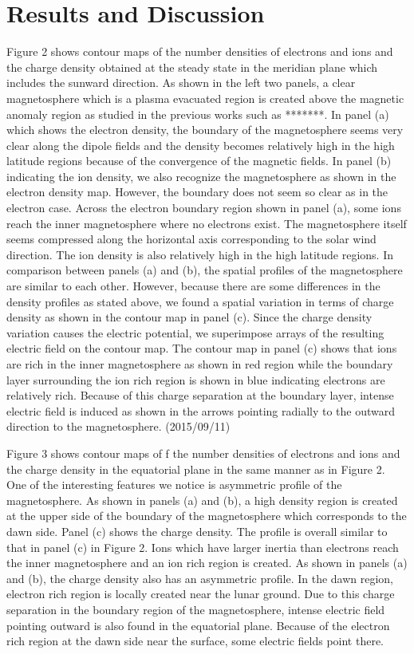 \documentclass{EPS}
\begin{document}
\section{Results and Discussion}


Figure 2 shows contour maps of the number densities of electrons and ions and the charge 
density obtained at the steady state in the meridian plane which includes the sunward direction. 
As shown in the left two panels, a clear magnetosphere which is a plasma evacuated region is 
created above the magnetic anomaly region as studied in the previous works such as *******. 
In panel (a) which shows the electron density, the boundary of the magnetosphere seems 
very clear along the dipole fields and the density becomes relatively high in the high latitude regions 
because of the convergence of the magnetic fields.  
In panel (b) indicating the ion density, we also recognize the magnetosphere as shown in the electron density map. 
However, the boundary does not seem so clear as in the electron case. 
Across the electron boundary region shown in panel (a), some ions reach the inner magnetosphere 
where no electrons exist. 
The magnetosphere itself seems compressed along the horizontal axis corresponding to the solar wind direction. 
The ion density is also relatively high in the high latitude regions. 
In comparison between panels (a) and (b), the spatial profiles of the magnetosphere are similar to each other. 
However, because there are some differences in the density profiles as stated above, 
we found a spatial variation in terms of charge density as shown in the contour map in panel (c). 
Since the charge density variation causes the electric potential, 
we superimpose arrays of the resulting electric field on the contour map. 
The contour map in panel (c) shows that ions are rich in the inner magnetosphere as shown in red region 
while the boundary layer surrounding the ion rich region is shown in blue indicating electrons are relatively rich. 
Because of this charge separation at the boundary layer, intense electric field is induced 
as shown in the arrows pointing radially to the outward direction to the magnetosphere.  (2015/09/11)

Figure 3 shows contour maps of f the number densities of electrons and ions and the charge density 
in the equatorial plane in the same manner as in Figure 2. 
One of the interesting features we notice is asymmetric profile of the magnetosphere. 
As shown in panels (a) and (b), a high density region is created 
at the upper side of the boundary of the magnetosphere which corresponds to the dawn side. 
Panel (c) shows the charge density. 
The profile is overall similar to that in panel (c) in Figure 2. Ions which have larger inertia 
than electrons reach the inner magnetosphere and an ion rich region is created. 
As shown in panels (a) and (b), the charge density also has an asymmetric profile. 
In the dawn region, electron rich region is locally created near the lunar ground. 
Due to this charge separation in the boundary region of the magnetosphere, 
intense electric field pointing outward is also found in the equatorial plane. 
Because of the electron rich region at the dawn side near the surface, some electric fields point there. 
\end{document}

